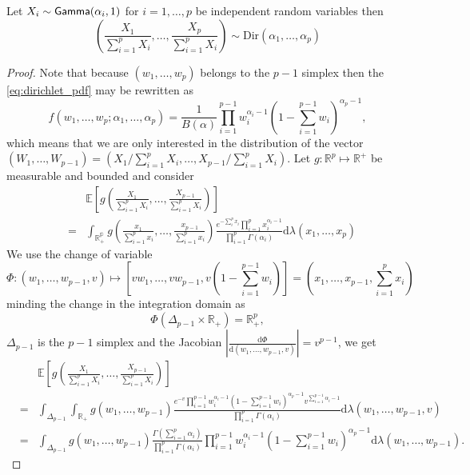 \begin{prop}\label{prop:gamma_to_dirichlet}
Let $X_i\sim \mathsf{Gamma}(\alpha_i,1)$ for $i = 1,\ldots, p$ be independent random variables then 
\[
\left(\frac{X_1}{\sum_{i=1}^{p}X_i},\ldots, \frac{X_p}{\sum_{i=1}^{p}X_i}\right)\sim\text{Dir}(\alpha_1,\ldots, \alpha_p)
\]
\end{prop}
\begin{proof}
Note that because $(w_1,\ldots, w_p)$ belongs to the $p-1$ simplex then the \pdf \eqref{eq:dirichlet_pdf} may be rewritten as 
$$
f(w_1,\ldots, w_p;\alpha_1,\ldots, \alpha_p) = \frac{1}{B(\alpha)}\prod_{i=1}^{p-1} w_i^{\alpha_i-1}\left(1-\sum_{i=1}^{p-1} w_i\right)^{\alpha_p-1}, 
$$
which means that we are only interested in the distribution of the vector $\left(W_1,\ldots, W_{p-1}\right) = \left(X_{1}/\sum_{i=1}^{p}X_i,\ldots, X_{p-1}/\sum_{i=1}^{p}X_i\right)$.
Let $g:\mathbb{R}^p\mapsto \mathbb{R}^+$ be measurable and bounded and consider
\begin{eqnarray*}
&&\mathbb{E}\left[g\left(\frac{X_1}{\sum_{i=1}^{p}X_i},\ldots, \frac{X_{p-1}}{\sum_{i=1}^{p}X_i}\right)\right]\\
&=&\int_{\mathbb{R_+^p}}g\left(\frac{x_1}{\sum_{i=1}^{p}x_i},\ldots, \frac{x_{p-1}}{\sum_{i=1}^{p}x_i}\right)\frac{e^{-\sum_{i}^px_i}\prod_{i=1}^px_i^{\alpha_i-1}}{\prod_{i=1}^p\Gamma(\alpha_i)}\text{d}\lambda(x_1,\ldots, x_p)
\end{eqnarray*}
We use the change of variable 
\[
\Phi:(w_1,\ldots, w_{p-1}, v) \mapsto \left[vw_1,\ldots, vw_{p-1}, v\left(1-\sum_{i=1}^{p-1}w_i\right)\right] = \left(x_1, \ldots, x_{p-1},\sum_{i=1}^{p}x_i\right)   
\]
minding the change in the integration domain as 
$$
\Phi(\Delta_{p-1}\times \mathbb{R}_+) = \mathbb{R}^p_+ ,
$$
$\Delta_{p-1}$ is the $p-1$ simplex and the Jacobian $\left|\frac{\text{d}\Phi}{\text{d}(w_1,\ldots, w_{p-1},v)}\right|=v^{p-1}$, we get 
 \begin{eqnarray*}
 &&\mathbb{E}\left[g\left(\frac{X_1}{\sum_{i=1}^{p}X_i},\ldots, \frac{X_{p-1}}{\sum_{i=1}^{p}X_i}\right)\right]\\
&=&\int_{\Delta_{p-1}}\int_{\mathbb{R}_+}g\left(w_1,\ldots, w_{p-1}\right) \frac{e^{- v}\prod_{i=1}^{p-1}w_i^{\alpha_i-1}\left(1-\sum_{i=1}^{p-1}w_i\right)^{\alpha_p-1}v^{\sum_{i=1}^{p-1}\alpha_i-1}}
{\prod_{i=1}^p\Gamma(\alpha_i)}\text{d}\lambda(w_1,\ldots, w_{p-1}, v)\\
&=&\int_{\Delta_{p-1}}g\left(w_1,\ldots, w_{p-1}\right) \frac{\Gamma\left(\sum_{i =1}^{p}\alpha_i\right)}{\prod_{i=1}^p\Gamma(\alpha_i)}\prod_{i=1}^{p-1}w_i^{\alpha_i-1}\left(1-\sum_{i=1}^{p-1}w_i\right)^{\alpha_p-1}\text{d}\lambda(w_1,\ldots, w_{p-1}).
\end{eqnarray*} 
\end{proof}
